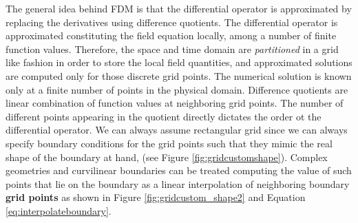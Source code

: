 The general idea behind FDM is that the differential operator is approximated by replacing the derivatives using difference quotients. The differential operator is approximated constituting the field equation locally, among a number of finite function values. Therefore, the space and time domain are \textit{partitioned} in a grid like fashion in order to store the local field quantities, and approximated solutions are computed only for those discrete grid points. The numerical solution is known only at a finite number of points in the physical domain. 
Difference quotients are linear combination of function values at neighboring grid points. The number of different points appearing in the quotient directly dictates the order ot the differential operator.
We can always assume rectangular grid since we can always  specify boundary conditions for the grid points such that they mimic the real shape of the boundary at hand, (see Figure \ref{fig:gridcustomshape}).
Complex geometries and curvilinear boundaries can be treated computing the value of such points that lie on the boundary as a linear interpolation of neighboring boundary \textbf{grid points} as shown in Figure \ref{fig:gridcustom_shape2} and Equation \ref{eq:interpolateboundary}.

